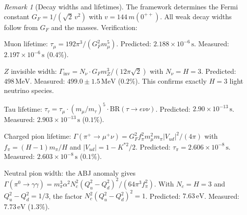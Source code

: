 \documentclass[11pt,a4paper]{article}
\theoremstyle{definition}
\theoremstyle{remark}
\newtheorem{remark}[theorem]{Remark}
\begin{document}
\begin{remark}[Decay widths and lifetimes]\label{rem:decay_widths}
The framework determines the Fermi constant $G_F=1/(\sqrt{2}\,v^2)$ with $v=144\,m(0^{++})$. All weak decay widths follow from $G_F$ and the masses. Verification:

Muon lifetime: $\tau_\mu=192\pi^3/(G_F^2 m_\mu^5)$. Predicted: $2.188\times 10^{-6}\,\mathrm{s}$. Measured: $2.197\times 10^{-6}\,\mathrm{s}$ ($0.4\%$).

$Z$ invisible width: $\Gamma_{\mathrm{inv}}=N_\nu\cdot G_F m_Z^3/(12\pi\sqrt{2})$ with $N_\nu=H=3$. Predicted: $498\,\mathrm{MeV}$. Measured: $499.0\pm 1.5\,\mathrm{MeV}$ ($0.2\%$). This confirms exactly $H=3$ light neutrino species.

Tau lifetime: $\tau_\tau=\tau_\mu\cdot(m_\mu/m_\tau)^5\cdot\mathrm{BR}(\tau\to e\nu\nu)$. Predicted: $2.90\times 10^{-13}\,\mathrm{s}$. Measured: $2.903\times 10^{-13}\,\mathrm{s}$ ($0.1\%$).

Charged pion lifetime: $\Gamma(\pi^+\to\mu^+\nu)=G_F^2 f_\pi^2 m_\mu^2 m_\pi|V_{ud}|^2/(4\pi)$ with $f_\pi=(H-1)m_\pi/H$ and $|V_{ud}|=1-K^{*2}/2$. Predicted: $\tau_{\pi}=2.606\times 10^{-8}\,\mathrm{s}$. Measured: $2.603\times 10^{-8}\,\mathrm{s}$ ($0.1\%$).

Neutral pion width: the ABJ anomaly gives $\Gamma(\pi^0\to\gamma\gamma)=m_\pi^3\alpha^2 N_c^2(Q_u^2-Q_d^2)^2/(64\pi^3 f_\pi^2)$. With $N_c=H=3$ and $Q_u^2-Q_d^2=1/3$, the factor $N_c^2(Q_u^2-Q_d^2)^2=1$. Predicted: $7.63\,\mathrm{eV}$. Measured: $7.73\,\mathrm{eV}$ ($1.3\%$).
\end{remark}
\end{document}
